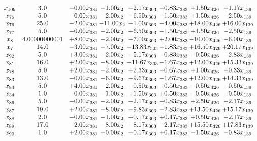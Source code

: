 \documentclass[8pt]{article}
\begin{document}
\[\begin{array}{c| c c@{\hskip 2pt} c@{\hskip 2pt} c@{\hskip 2pt} c@{\hskip 2pt} c@{\hskip 2pt} c@{\hskip 2pt} }
 x_{109}   &  3.0 & -0.00 x_{381} & -1.00 x_{2} & +  2.17 x_{303} & -0.83 x_{383} & +  1.50 x_{426} & +  1.17 x_{139}\\
 x_{75}   &  5.0 & -0.00 x_{381} & -2.00 x_{2} & +  6.50 x_{303} & -1.50 x_{383} & +  1.50 x_{426} & -2.50 x_{139}\\
 x_{76}   &  25.0 & -2.00 x_{381} & -11.00 x_{2} & -1.00 x_{303} & -4.00 x_{383} & + 18.00 x_{426} & + 16.00 x_{139}\\
 x_{77}   &  5.0 & -0.00 x_{381} & -2.00 x_{2} & +  6.50 x_{303} & -1.50 x_{383} & +  1.50 x_{426} & -2.50 x_{139}\\
 x_{8}   &  4.00000000001 & +  8.00 x_{381} & -2.00 x_{2} & -7.00 x_{303} & +  2.00 x_{383} & -10.00 x_{426} & -6.00 x_{139}\\
 x_{7}   &  14.0 & -3.00 x_{381} & -7.00 x_{2} & -13.83 x_{303} & -1.83 x_{383} & + 16.50 x_{426} & + 20.17 x_{139}\\
 x_{92}   &  5.0 & +  3.00 x_{381} & -2.00 x_{2} & +  5.17 x_{303} & -0.83 x_{383} & -0.50 x_{426} & -2.83 x_{139}\\
 x_{81}   &  16.0 & +  2.00 x_{381} & -8.00 x_{2} & -11.67 x_{303} & -1.67 x_{383} & + 12.00 x_{426} & + 15.33 x_{139}\\
 x_{78}   &  5.0 & +  2.00 x_{381} & -2.00 x_{2} & +  2.33 x_{303} & -0.67 x_{383} & +  1.00 x_{426} & +  0.33 x_{139}\\
 x_{83}   &  13.0 & -0.00 x_{381} & -6.00 x_{2} & -9.67 x_{303} & -1.67 x_{383} & + 12.00 x_{426} & + 14.33 x_{139}\\
 x_{84}   &  5.0 & +  4.00 x_{381} & -2.00 x_{2} & -0.50 x_{303} & -0.50 x_{383} & -0.50 x_{426} & -0.50 x_{139}\\
 x_{34}   &  1.0 & -0.00 x_{381} & -1.00 x_{2} & +  1.50 x_{303} & +  0.50 x_{383} & -0.50 x_{426} & -0.50 x_{139}\\
 x_{86}   &  5.0 & -0.00 x_{381} & -2.00 x_{2} & +  2.17 x_{303} & -0.83 x_{383} & +  2.50 x_{426} & +  2.17 x_{139}\\
 x_{87}   &  19.0 & +  2.00 x_{381} & -8.00 x_{2} & -9.83 x_{303} & -2.83 x_{383} & + 13.50 x_{426} & + 15.17 x_{139}\\
 x_{88}   &  2.0 & -0.00 x_{381} & -1.00 x_{2} & +  0.17 x_{303} & +  0.17 x_{383} & +  0.50 x_{426} & +  2.17 x_{139}\\
 x_{89}   &  17.0 & -2.00 x_{381} & -8.00 x_{2} & -8.17 x_{303} & -2.17 x_{383} & + 15.50 x_{426} & + 17.83 x_{139}\\
 x_{90}   &  1.0 & +  2.00 x_{381} & +  0.00 x_{2} & +  0.17 x_{303} & +  0.17 x_{383} & -1.50 x_{426} & -0.83 x_{139}\\

\end{array}\]
\end{document}
